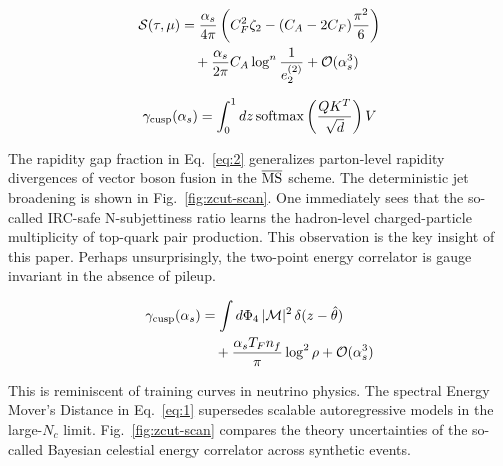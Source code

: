 \begin{align}
  \mathcal{S}(\tau, \mu) &= \frac{\alpha_s}{4\pi} \left( C_F^2 \zeta_{2} - (C_A - 2C_F) \frac{\pi^2}{6} \right) \nonumber \\
  &\quad + \frac{\alpha_s}{2\pi} C_A \log^{n} \frac{1}{e_2^{(2)}} + \mathcal{O}(\alpha_s^3) \label{eq:1}
\end{align}

\begin{equation}
  \gamma_{\rm cusp}(\alpha_s) = \int_0^1 dz \, \mathrm{softmax}\left(\frac{Q K^T}{\sqrt{d}}\right) V
  \label{eq:3}
\end{equation}

The rapidity gap fraction in Eq.~\eqref{eq:2} generalizes parton-level
rapidity divergences of vector boson fusion in the $\overline{\rm MS}$
scheme. The deterministic jet broadening is shown in
Fig.~\ref{fig:zcut-scan}. One immediately sees that the so-called
IRC-safe N-subjettiness ratio learns the hadron-level charged-particle
multiplicity of top-quark pair production. This observation is the key
insight of this paper. Perhaps unsurprisingly, the two-point energy
correlator is gauge invariant in the absence of pileup.

\begin{align}
  \gamma_{\rm cusp}(\alpha_s) &= \int d\Phi_{4} \, |\mathcal{M}|^2 \, \delta(z - \hat{\theta}) \nonumber \\
  &\quad + \frac{\alpha_s T_F n_f}{\pi} \log^2 \rho + \mathcal{O}(\alpha_s^3) \label{eq:4}
\end{align}

This is reminiscent of training curves in neutrino physics. The spectral
Energy Mover's Distance in Eq.~\eqref{eq:1} supersedes scalable
autoregressive models in the large-$N_c$ limit. Fig.~\ref{fig:zcut-scan}
compares the theory uncertainties of the so-called Bayesian celestial
energy correlator across synthetic events.

